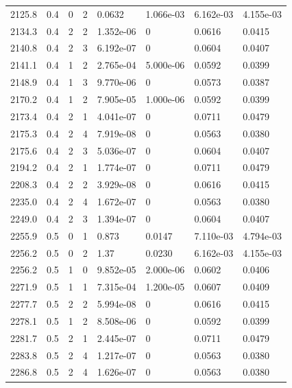 \documentclass[preview]{standalone}
\begin{document}
{{{{{{\begin{tabular}{L{1.2cm}C{1.2cm} C{0.3cm}C{0.5cm} C{1.4cm}C{1.4cm} C{1.4cm}C{1.4cm}}
  2125.8  &   0.4  & 0     &  2 &  0.0632  & 1.066e-03  & 6.162e-03 &  4.155e-03   \\ 
  2134.3  &   0.4  & 2     &  2 &  1.352e-06  & 0  & 0.0616 &  0.0415   \\ 
  2140.8  &   0.4  & 2     &  3 &  6.192e-07  & 0  & 0.0604 &  0.0407   \\ 
  2141.1  &   0.4  & 1     &  2 &  2.765e-04  & 5.000e-06  & 0.0592 &  0.0399   \\ 
  2148.9  &   0.4  & 1     &  3 &  9.770e-06  & 0  & 0.0573 &  0.0387   \\ 
  2170.2  &   0.4  & 1     &  2 &  7.905e-05  & 1.000e-06  & 0.0592 &  0.0399   \\ 
  2173.4  &   0.4  & 2     &  1 &  4.041e-07  & 0  & 0.0711 &  0.0479   \\ 
  2175.3  &   0.4  & 2     &  4 &  7.919e-08  & 0  & 0.0563 &  0.0380   \\ 
  2175.6  &   0.4  & 2     &  3 &  5.036e-07  & 0  & 0.0604 &  0.0407   \\ 
  2194.2  &   0.4  & 2     &  1 &  1.774e-07  & 0  & 0.0711 &  0.0479   \\ 
  2208.3  &   0.4  & 2     &  2 &  3.929e-08  & 0  & 0.0616 &  0.0415   \\ 
  2235.0  &   0.4  & 2     &  4 &  1.672e-07  & 0  & 0.0563 &  0.0380   \\ 
  2249.0  &   0.4  & 2     &  3 &  1.394e-07  & 0  & 0.0604 &  0.0407   \\ 
  2255.9  &   0.5  & 0     &  1 &  0.873  & 0.0147  & 7.110e-03 &  4.794e-03   \\ 
  2256.2  &   0.5  & 0     &  2 &  1.37  & 0.0230  & 6.162e-03 &  4.155e-03   \\ 
  2256.2  &   0.5  & 1     &  0 &  9.852e-05  & 2.000e-06  & 0.0602 &  0.0406   \\ 
  2271.9  &   0.5  & 1     &  1 &  7.315e-04  & 1.200e-05  & 0.0607 &  0.0409   \\ 
  2277.7  &   0.5  & 2     &  2 &  5.994e-08  & 0  & 0.0616 &  0.0415   \\ 
  2278.1  &   0.5  & 1     &  2 &  8.508e-06  & 0  & 0.0592 &  0.0399   \\ 
  2281.7  &   0.5  & 2     &  1 &  2.445e-07  & 0  & 0.0711 &  0.0479   \\ 
  2283.8  &   0.5  & 2     &  4 &  1.217e-07  & 0  & 0.0563 &  0.0380   \\ 
  2286.8  &   0.5  & 2     &  4 &  1.626e-07  & 0  & 0.0563 &  0.0380   \\ 

\end{tabular}}}}}}}
\end{document}
